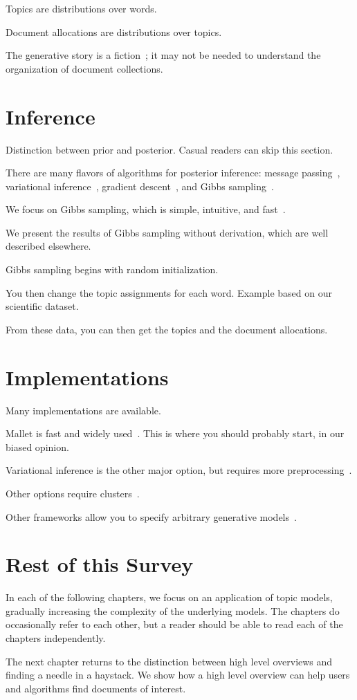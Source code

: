 Topics are distributions over words.

Document allocations are distributions over topics.

The generative story is a fiction~\citep{box-87}; it may not be needed
to understand the organization of document collections.

\section{Inference}

Distinction between prior and posterior.  Casual readers can skip this
section.

There are many flavors of algorithms for posterior inference: message
passing~\citep{zeng-13}, variational inference~\citep{blei-03}, gradient
descent~\citep{hoffman-10}, and Gibbs sampling~\citep{griffiths-04}.

We focus on Gibbs sampling, which is simple, intuitive, and
fast~\citep{yao-09}.

We present the results of Gibbs sampling without derivation, which are
well described elsewhere.

Gibbs sampling begins with random initialization.

You then change the topic assignments for each word. Example based on
our scientific dataset.

From these data, you can then get the topics and the document
allocations.

\section{Implementations}

Many implementations are available.

Mallet is fast and widely used~\citep{mallet}.  This is where you
should probably start, in our biased opinion.

Variational inference is the other major option, but requires more
preprocessing~\citep{blei-03,vw}.

Other options require clusters~\citep{Narayanamurthy-11,zhai-12}.

Other frameworks allow you to specify arbitrary generative
models~\citep{stan-software:2014}.

\section{Rest of this Survey}

In each of the following chapters, we focus on an application of topic
models, gradually increasing the complexity of the underlying models.
The chapters do occasionally refer to each other, but a reader should
be able to read each of the chapters independently.

The next chapter returns to the distinction between high level
overviews and finding a needle in a haystack.  We show how a high
level overview can help users and algorithms find documents of
interest.
